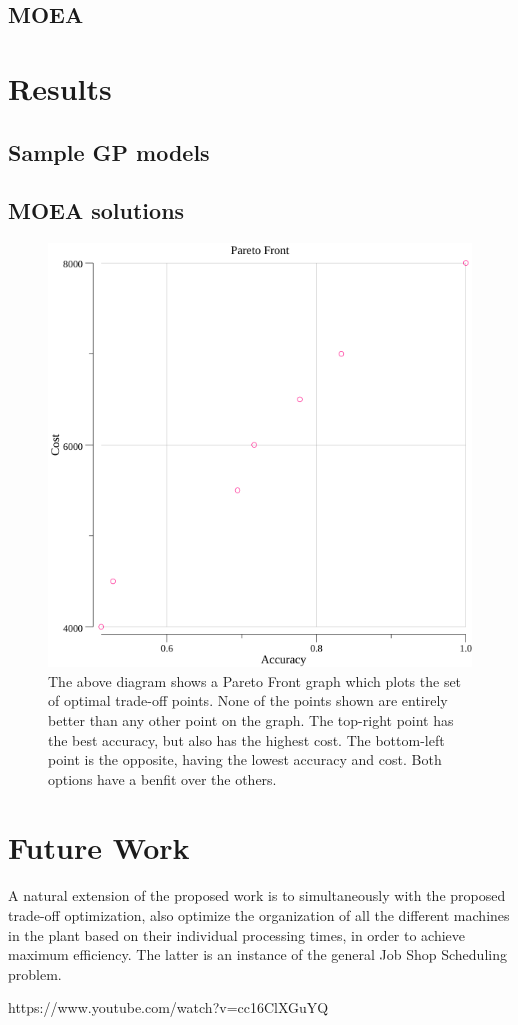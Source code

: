 \documentclass{IEEEtran}
\begin{document}
\subsection{MOEA}

\section{Results}
\subsection{Sample GP models}

\subsection{MOEA solutions}
\begin{figure}[!t]
\centerline{\includegraphics[width=\columnwidth]{points.png}}
\caption{The above diagram shows a Pareto Front graph which plots the set of optimal trade-off points. None of the points shown are entirely better than any other point on the graph. The top-right point has the best accuracy, but also has the highest cost. The bottom-left point is the opposite, having the lowest accuracy and cost. Both options have a benfit over the others.}
\end{figure}

\section{Future Work}
A natural extension of the proposed work is to simultaneously with the proposed trade-off optimization, also optimize the organization of all the different machines in the plant based on their individual processing times, in order to achieve maximum efficiency. The latter is an instance of the general Job Shop Scheduling problem.

\begin{thebibliography}{00}
 https://www.youtube.com/watch?v=cc16ClXGuYQ
\end{thebibliography}
\end{document}
